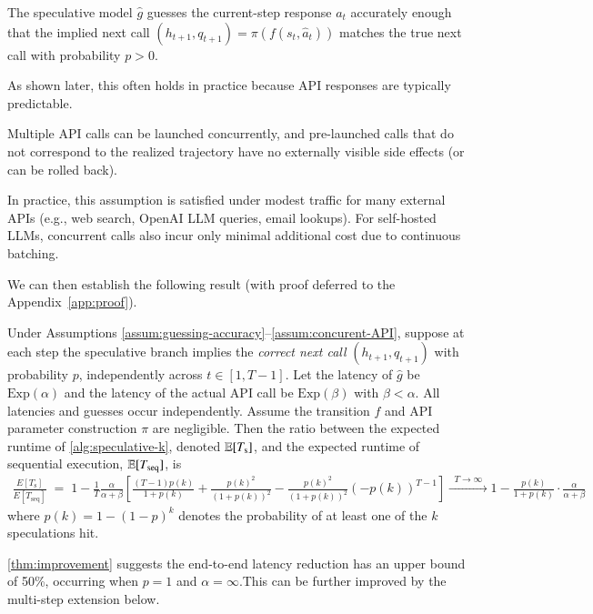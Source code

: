 \begin{assumption}\label{assum:guessing-accuracy}
The speculative model $\hat g$ guesses the current-step response $a_t$ accurately enough that
the implied next call $(h_{t+1},q_{t+1})=\pi(f(s_t,\hat a_t))$ matches the true next call with probability $p>0$.
\end{assumption}


As shown later, this often holds in practice because API responses are typically predictable.  

\begin{assumption}\label{assum:concurent-API}
Multiple API calls can be launched concurrently, and pre-launched calls that do not correspond to
the realized trajectory have no externally visible side effects (or can be rolled back).
\end{assumption}


In practice, this assumption is satisfied under modest traffic for many external APIs (e.g., web search, OpenAI LLM queries, email lookups). For self-hosted LLMs, concurrent calls also incur only minimal additional cost due to continuous batching.  

We can then establish the following result (with proof deferred to the Appendix~\ref{app:proof}).  


\begin{proposition}
\label{thm:improvement}
Under Assumptions \ref{assum:guessing-accuracy}--\ref{assum:concurent-API}, suppose at each step
the speculative branch implies the \emph{correct next call} $(h_{t+1},q_{t+1})$ with probability $p$, independently across $t\in[1,T-1]$. Let the latency of $\hat{g}$ be $\mathrm{Exp}(\alpha)$ and the latency of the actual API call be $\mathrm{Exp}(\beta)$ with $\beta < \alpha$. All latencies and guesses occur independently. Assume the transition $f$ and API parameter construction $\pi$ are negligible. Then the ratio between the expected runtime of \cref{alg:speculative-k}, denoted $\mathbb{E}[T_{\mathrm{s}}]$, and the expected runtime of sequential execution, $\mathbb{E}[T_{\mathrm{seq}}]$, is
{\small\begin{align*}
    \frac{E[T_{\mathrm{s}}]}{E[T_{\mathrm{seq}}]}
    \;=\;
    1 - \frac{1}{T}\frac{\alpha}{\alpha+\beta}\left[\frac{(T-1)p(k)}{1+p(k)}+\frac{p(k)^2}{(1+p(k))^2} - \frac{p(k)^2}{(1+p(k))^2}(-p(k))^{T-1}\right]\xrightarrow{\;\;T\to\infty\;\;}
    1-\frac{p(k)}{1+p(k)}\cdot\frac{\alpha}{\alpha+\beta}
\end{align*}}
where $p(k) = 1- (1-p)^k$ denotes the probability of at least one of the $k$ speculations hit.
\end{proposition}
\cref{thm:improvement} suggests the end-to-end latency reduction has an upper bound of 50\%, occurring when $p=1$ and $\alpha=\infty$.This can be further improved by the multi-step extension below.  

